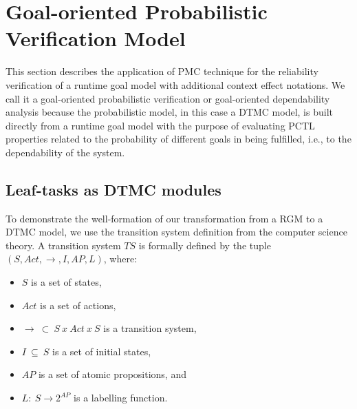 \section{Goal-oriented Probabilistic Verification Model}\label{ssec:NFR-verification}


This section describes the application of PMC technique for the reliability verification of a runtime goal model with additional context effect notations. We call it a goal-oriented probabilistic verification or goal-oriented dependability analysis because the probabilistic model, in this case a DTMC model, is built directly from a runtime goal model with the purpose of evaluating PCTL properties related to the probability of different goals in being fulfilled, i.e., to the dependability of the system.


\subsection{Leaf-tasks as DTMC modules}

To demonstrate the well-formation of our transformation from a RGM to a DTMC model, we use the transition system definition from the computer science theory. A transition system $TS$ is formally defined by the tuple $(S, Act, \rightarrow, I, AP, L)$, where:

\begin{itemize}

\item $S$ is a set of states,
\medskip

\item $Act$ is a set of actions,
\medskip

\item $\rightarrow\ \subset\ S\ x\ Act\ x\ S$ is a transition system,
\medskip

\item $I\ \subseteq\ S$ is a set of initial states,
\medskip

\item $AP$ is a set of atomic propositions, and
\medskip

\item $L:\ S\rightarrow2^{AP}$ is a labelling function.

\end{itemize}

